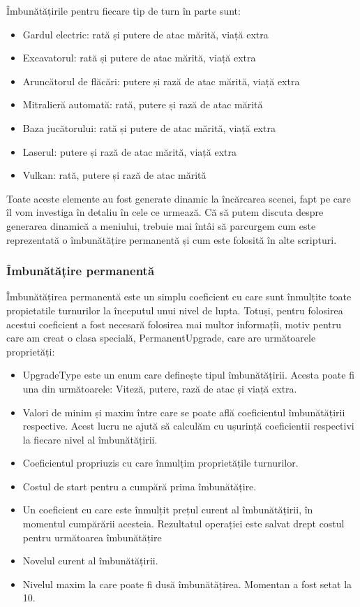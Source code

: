 \documentclass[12pt, a4paper]{article}
\begin{document}
	Îmbunătățirile pentru fiecare tip de turn în parte sunt:
	
	\begin{itemize}
		\item Gardul electric: rată și putere de atac mărită, viață extra
		\item Excavatorul: rată și putere de atac mărită, viață extra
		\item Aruncătorul de flăcări: putere și rază de atac mărită, viață extra
		\item Mitralieră automată: rată, putere și rază de atac mărită
		\item Baza jucătorului: rată și putere de atac mărită, viață extra
		\item Laserul: putere și rază de atac mărită, viață extra
		\item Vulkan: rată, putere și rază de atac mărită
	\end{itemize}
	
	Toate aceste elemente au fost generate dinamic la încărcarea scenei, fapt pe care îl vom investiga în detaliu în cele ce urmează. Că să putem discuta despre generarea dinamică a meniului, trebuie mai întâi să parcurgem cum este reprezentată o îmbunătățire permanentă și cum este folosită în alte scripturi.
	
	
	
	
	
	\subsubsection{Îmbunătățire permanentă}
	
	Îmbunătățirea permanentă este un simplu coeficient cu care sunt înmulțite toate propietatile turnurilor la începutul unui nivel de lupta. Totuși, pentru folosirea acestui coeficient a fost necesară folosirea mai multor informațîi, motiv pentru care am creat o clasa specială, PermanentUpgrade, care are următoarele proprietăți:
	
	\begin{itemize}
		\item UpgradeType este un enum care definește tipul îmbunătățirii. Acesta poate fi una din următoarele: Viteză, putere, rază de atac și viață extra.
		\item Valori de minim și maxim între care se poate află coeficientul îmbunătățirii respective. Acest lucru ne ajută să calculăm cu ușurință coeficientii respectivi la fiecare nivel al îmbunătățirii.
		\item Coeficientul propriuzis cu care înmulțim proprietățile turnurilor.
		\item Costul de start pentru a cumpără prima îmbunătățire.
		\item Un coeficient cu care este înmulțit prețul curent al îmbunătățirii, în momentul cumpărării acesteia. Rezultatul operației este salvat drept costul pentru următoarea îmbunătățire
		\item Novelul curent al îmbunătățirii.
		\item Nivelul maxim la care poate fi dusă îmbunătățirea. Momentan a fost setat la 10.
	\end{itemize}
	
\end{document}
